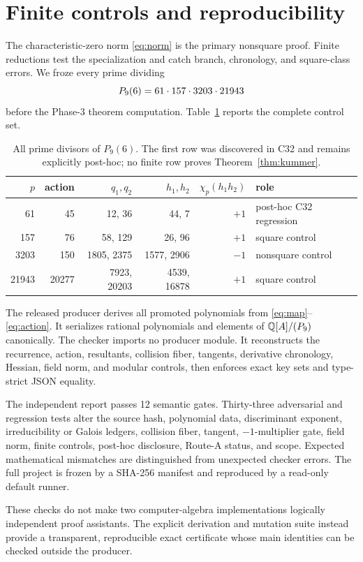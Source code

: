 \section{Finite controls and reproducibility}

The characteristic-zero norm \eqref{eq:norm} is the primary nonsquare proof.
Finite reductions test the specialization and catch branch, chronology, and
square-class errors.  We froze every prime dividing
\[
P_9(6)=61\cdot157\cdot3203\cdot21943
\]
before the Phase-3 theorem computation.  Table~\ref{tab:primes} reports the
complete control set.

\begin{table}[h]
\centering
\small
\begin{tabular}{rrrrrl}
\toprule
\(p\) & action & \(q_1,q_2\) & \(h_1,h_2\) & \(\chi_p(h_1h_2)\) & role \\
\midrule
61 & 45 & 12, 36 & 44, 7 & \(+1\) & post-hoc C32 regression \\
157 & 76 & 58, 129 & 26, 96 & \(+1\) & square control \\
3203 & 150 & 1805, 2375 & 1577, 2906 & \(-1\) & nonsquare control \\
21943 & 20277 & 7923, 20203 & 4539, 16878 & \(+1\) & square control \\
\bottomrule
\end{tabular}
\caption{All prime divisors of \(P_9(6)\).  The first row was discovered in
C32 and remains explicitly post-hoc; no finite row proves
Theorem~\ref{thm:kummer}.}
\label{tab:primes}
\end{table}

The released producer derives all promoted polynomials from
\eqref{eq:map}--\eqref{eq:action}.  It serializes rational polynomials and
elements of \(\mathbb{Q}[A]/(P_9)\) canonically.  The checker imports no producer
module.  It reconstructs the recurrence, action, resultants, collision
fiber, tangents, derivative chronology, Hessian, field norm, and modular
controls, then enforces exact key sets and type-strict JSON equality.

The independent report passes 12 semantic gates.  Thirty-three adversarial and
regression tests alter the source hash, polynomial data, discriminant
exponent, irreducibility or Galois ledgers, collision fiber, tangent,
\(-1\)-multiplier gate, field norm, finite controls, post-hoc disclosure,
Route-A status, and scope.  Expected
mathematical mismatches are distinguished from unexpected checker errors.
The full project is frozen by a SHA-256 manifest and reproduced by a
read-only default runner.

These checks do not make two computer-algebra implementations logically
independent proof assistants.  The explicit derivation and mutation suite
instead provide a transparent, reproducible exact certificate whose main
identities can be checked outside the producer.
